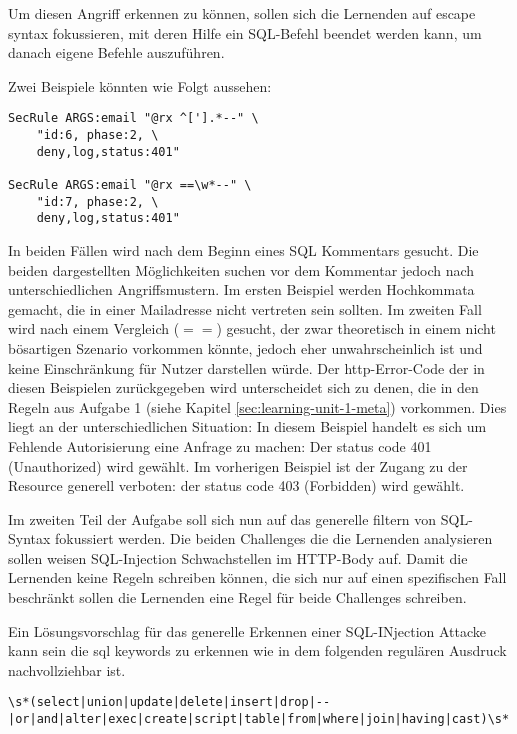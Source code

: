 Um diesen Angriff erkennen zu können, sollen sich die Lernenden auf escape syntax fokussieren, mit deren Hilfe ein SQL-Befehl beendet werden kann, um danach eigene Befehle auszuführen.

Zwei Beispiele könnten wie Folgt aussehen:\\

\begin{lstlisting}
SecRule ARGS:email "@rx ^['].*--" \ 
    "id:6, phase:2, \
    deny,log,status:401"

SecRule ARGS:email "@rx ==\w*--" \
    "id:7, phase:2, \
    deny,log,status:401"
\end{lstlisting}

In beiden Fällen wird nach dem Beginn eines SQL Kommentars gesucht.
Die beiden dargestellten Möglichkeiten suchen vor dem Kommentar jedoch nach unterschiedlichen Angriffsmustern.
Im ersten Beispiel werden Hochkommata gemacht, die in einer Mailadresse nicht vertreten sein sollten.
Im zweiten Fall wird nach einem Vergleich ($==$) gesucht, der zwar theoretisch in einem nicht bösartigen Szenario vorkommen könnte, jedoch eher unwahrscheinlich ist und keine Einschränkung für Nutzer darstellen würde.
Der \ac{http}-Error-Code der in diesen Beispielen zurückgegeben wird unterscheidet sich zu denen, die in den Regeln aus Aufgabe 1 (siehe Kapitel \ref{sec:learning-unit-1-meta}) vorkommen.
Dies liegt an der unterschiedlichen Situation:
In diesem Beispiel handelt es sich um Fehlende Autorisierung eine Anfrage zu machen:
Der status code 401 (Unauthorized) wird gewählt.
Im vorherigen Beispiel ist der Zugang zu der Resource generell verboten: der status code 403 (Forbidden) wird gewählt.

Im zweiten Teil der Aufgabe soll sich nun auf das generelle filtern von SQL-Syntax fokussiert werden.
Die beiden Challenges die die Lernenden analysieren sollen weisen SQL-Injection Schwachstellen im HTTP-Body auf.
Damit die Lernenden keine Regeln schreiben können, die sich nur auf einen spezifischen Fall beschränkt sollen die Lernenden eine Regel für beide Challenges schreiben.

Ein Lösungsvorschlag für das generelle Erkennen einer SQL-INjection Attacke kann sein die sql keywords zu erkennen wie in dem folgenden regulären Ausdruck nachvollziehbar ist.\\

\begin{lstlisting}
\s*(select|union|update|delete|insert|drop|--|or|and|alter|exec|create|script|table|from|where|join|having|cast)\s*
\end{lstlisting}\ \\

